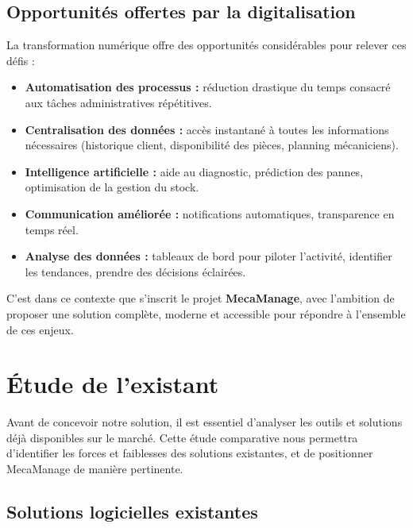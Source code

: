 \subsection{Opportunités offertes par la digitalisation}

La transformation numérique offre des opportunités considérables pour relever ces défis :

\begin{itemize}
    \item \textbf{Automatisation des processus :} réduction drastique du temps consacré aux tâches administratives répétitives.
    
    \item \textbf{Centralisation des données :} accès instantané à toutes les informations nécessaires (historique client, disponibilité des pièces, planning mécaniciens).
    
    \item \textbf{Intelligence artificielle :} aide au diagnostic, prédiction des pannes, optimisation de la gestion du stock.
    
    \item \textbf{Communication améliorée :} notifications automatiques, transparence en temps réel.
    
    \item \textbf{Analyse des données :} tableaux de bord pour piloter l'activité, identifier les tendances, prendre des décisions éclairées.
\end{itemize}

C'est dans ce contexte que s'inscrit le projet \textbf{MecaManage}, avec l'ambition de proposer une solution complète, moderne et accessible pour répondre à l'ensemble de ces enjeux.

\section{Étude de l'existant}

Avant de concevoir notre solution, il est essentiel d'analyser les outils et solutions déjà disponibles sur le marché. Cette étude comparative nous permettra d'identifier les forces et faiblesses des solutions existantes, et de positionner MecaManage de manière pertinente.

\subsection{Solutions logicielles existantes}

